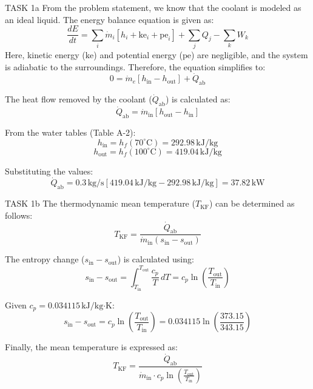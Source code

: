 TASK 1a  
From the problem statement, we know that the coolant is modeled as an ideal liquid. The energy balance equation is given as:  
\[
\frac{dE}{dt} = \sum_i \dot{m}_i \left[ h_i + \text{ke}_i + \text{pe}_i \right] + \sum_j Q_j - \sum_k W_k
\]  
Here, kinetic energy (\( \text{ke} \)) and potential energy (\( \text{pe} \)) are negligible, and the system is adiabatic to the surroundings. Therefore, the equation simplifies to:  
\[
0 = \dot{m}_e \left[ h_{\text{in}} - h_{\text{out}} \right] + \dot{Q}_{\text{ab}}
\]  

The heat flow removed by the coolant (\( \dot{Q}_{\text{ab}} \)) is calculated as:  
\[
\dot{Q}_{\text{ab}} = \dot{m}_{\text{in}} \left[ h_{\text{out}} - h_{\text{in}} \right]
\]  

From the water tables (Table A-2):  
\[
h_{\text{in}} = h_f(70^\circ\text{C}) = 292.98 \, \text{kJ/kg}  
\]  
\[
h_{\text{out}} = h_f(100^\circ\text{C}) = 419.04 \, \text{kJ/kg}  
\]  

Substituting the values:  
\[
\dot{Q}_{\text{ab}} = 0.3 \, \text{kg/s} \left[ 419.04 \, \text{kJ/kg} - 292.98 \, \text{kJ/kg} \right] = 37.82 \, \text{kW}
\]  

TASK 1b  
The thermodynamic mean temperature (\( T_{\text{KF}} \)) can be determined as follows:  
\[
T_{\text{KF}} = \frac{\dot{Q}_{\text{ab}}}{\dot{m}_{\text{in}} \left( s_{\text{in}} - s_{\text{out}} \right)}  
\]  

The entropy change (\( s_{\text{in}} - s_{\text{out}} \)) is calculated using:  
\[
s_{\text{in}} - s_{\text{out}} = \int_{T_{\text{in}}}^{T_{\text{out}}} \frac{c_p}{T} \, dT = c_p \ln \left( \frac{T_{\text{out}}}{T_{\text{in}}} \right)
\]  

Given \( c_p = 0.034115 \, \text{kJ/kg·K} \):  
\[
s_{\text{in}} - s_{\text{out}} = c_p \ln \left( \frac{T_{\text{out}}}{T_{\text{in}}} \right) = 0.034115 \ln \left( \frac{373.15}{343.15} \right)
\]  

Finally, the mean temperature is expressed as:  
\[
T_{\text{KF}} = \frac{\dot{Q}_{\text{ab}}}{\dot{m}_{\text{in}} \cdot c_p \ln \left( \frac{T_{\text{out}}}{T_{\text{in}}} \right)}
\]